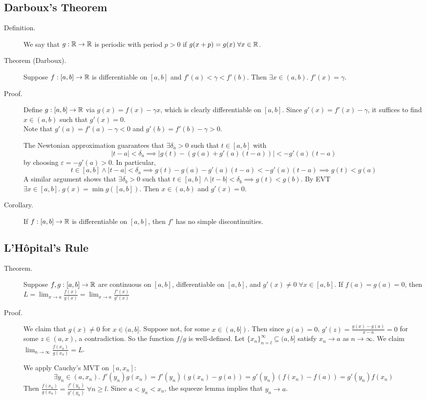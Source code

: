 \documentclass[letterpaper,11pt]{article}
\begin{document}
\subsection{Darboux's Theorem}
\begin{description}
\item[Definition.] We say that $g:\mathbb{R}\to\mathbb{R}$ is periodic with period $p>0$
  if $g(x+p)=g(x)\;\forall x\in\mathbb{R}$.

\item[Theorem (Darboux).] Suppose $f:[a,b]\to\mathbb{R}$ is differentiable on $[a,b]$
    and $f'(a)<\gamma<f'(b)$. Then $\exists x\in(a,b).\;f'(x)=\gamma$.

\item[Proof.] Define $g:[a,b]\to\mathbb{R}$ via $g(x)=f(x)-\gamma x$, which is
    clearly differentiable on $[a,b]$. Since $g'(x)=f'(x)-\gamma$, it suffices
    to find $x\in(a,b)$ such that $g'(x)=0$.\\
    Note that $g'(a)=f'(a)-\gamma<0$ and $g'(b)=f'(b)-\gamma>0$.

    The Newtonian approximation guarantees that $\exists\delta_a>0$
    such that $t\in[a,b]$ with 
    \[
    |t-a|<\delta_a\implies|g(t)-(g(a)+g'(a)(t-a))|<-g'(a)(t-a)
    \]
    by choosing $\varepsilon=-g'(a)>0$. In particular,
    \[
    t\in[a,b]\wedge|t-a|<\delta_a\implies g(t)-g(a)-g'(a)(t-a)<-g'(a)(t-a)
      \implies g(t)<g(a)
    \]
    A similar argument shows that $\exists\delta_b>0$ such that
    $t\in[a,b]\wedge|t-b|<\delta_b\implies g(t)<g(b)$.
    By EVT $\exists x\in[a,b].\;g(x)=\min g([a,b])$.
    Then $x\in(a,b)$ and $g'(x)=0$.

\item[Corollary.] If $f:[a,b]\to\mathbb{R}$ is differentiable on $[a,b]$, then
    $f'$ has no simple discontinuities.
\end{description}

\subsection{L'H\^{o}pital's Rule}
\begin{description}
\item[Theorem.] Suppose $f,g:[a,b]\to\mathbb{R}$ are continuous on $[a,b]$,
    differentiable on $[a,b]$, and $g'(x)\ne0\;\forall x\in[a,b]$.
    If $f(a)=g(a)=0$, then
    $L=\lim_{x\to a}\frac{f(x)}{g(x)}=\lim_{x\to a}\frac{f'(x)}{g'(x)}$

\item[Proof.] We claim that $g(x)\ne0$ for $x\in(a,b]$.
    Suppose not, for some $x\in(a,b])$. Then since $g(a)=0$,
    $g'(z)=\frac{g(x)-g(a)}{x-a}=0$ for some $z\in(a,x)$, a contradiction.
    So the function $f/g$ is well-defined.
    Let $\{x_n\}_{n=l}^\infty\subseteq(a,b]$ satisfy $x_n\to a$ as
    $n\to\infty$. We claim $\lim_{n\to\infty}\frac{f(x_n)}{g(x_n)}=L$.

    We apply Cauchy's MVT on $[a,x_n]$:
    \[
    \exists y_n\in(a,x_n).\;f'(y_n)g(x_n)=
      f'(y_n)(g(x_n)-g(a))=g'(y_n)(f(x_n)-f(a))=g'(y_n)f(x_n)
    \]
    Then $\frac{f(x_n)}{g(x_n)}=\frac{f'(y_n)}{g'(y_n)}\;\forall n\ge l$.
    Since $a<y_n<x_n$, the squeeze lemma implies that $y_n\to a$.
\end{description}
\end{document}
